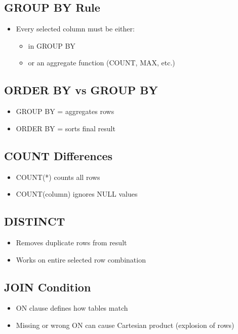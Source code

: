 \documentclass[10pt]{article}
\begin{document}
\subsection{GROUP BY Rule}
\begin{itemize}
\item Every selected column must be either:
    \begin{itemize}
    \item in GROUP BY
    \item or an aggregate function (COUNT, MAX, etc.)
    \end{itemize}
\end{itemize}

\subsection{ORDER BY vs GROUP BY}
\begin{itemize}
\item GROUP BY = aggregates rows
\item ORDER BY = sorts final result
\end{itemize}

\subsection{COUNT Differences}
\begin{itemize}
\item COUNT(*) counts all rows
\item COUNT(column) ignores NULL values
\end{itemize}

\subsection{DISTINCT}
\begin{itemize}
\item Removes duplicate rows from result
\item Works on entire selected row combination
\end{itemize}

\subsection{JOIN Condition}
\begin{itemize}
\item ON clause defines how tables match
\item Missing or wrong ON can cause Cartesian product (explosion of rows)
\end{itemize}
\end{document}
